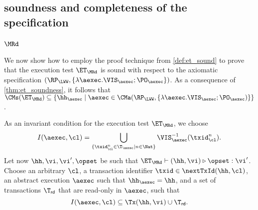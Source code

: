 \subsection{soundness and completeness of the specification}

\subsubsection{\( \MRd \)}

We now show how to employ the proof technique from \cref{def:et_sound} to prove that the execution 
test $\ET_\MRd$ is sound with respect to the axiomatic specification $(\RP_{\LWW}, \{\lambda \aexec. \VIS_{\aexec} ; \PO_{\aexec} \})$. 
As a consequence of \cref{thm:et_soundness}, it follows that $\CMs(\ET_{\MRd}) \subseteq \{ \hh_{\aexec} \mid \aexec \in \CMa(\RP_{\LWW}, 
\{\lambda \aexec. \VIS_{\aexec} ; \PO_{\aexec})\} \}$. 

As an invariant condition for the execution test $\ET_{\MRd}$, we choose 
\[
I(\aexec, \cl) = \bigcup_{\{\txid_{\cl}^{n} \in \T_{\aexec} \mid n \in \Nat\}} \VIS_{\aexec}^{-1}(\txid^n_\cl).
\]
Let now $\hh, \vi, \vi', \opset$ be such that $\ET_{\MRd} \vdash (\hh, \vi) \triangleright \opset: \vi'$. 
Choose an arbitrary $\cl$, a transaction identifier $\txid \in \nextTxId(\hh, \cl)$, 
an abstract execution $\aexec$ such that $\hh_{\aexec} = \hh$, and a set of 
transactions $\T_{\mathsf{rd}}$ that are read-only in $\aexec$, such that 
\begin{equation}
I(\aexec, \cl) \subseteq \Tx(\hh, \vi) \cup \T_{\mathsf{rd}}.
\label{eq:mr_invariant}
\end{equation}

